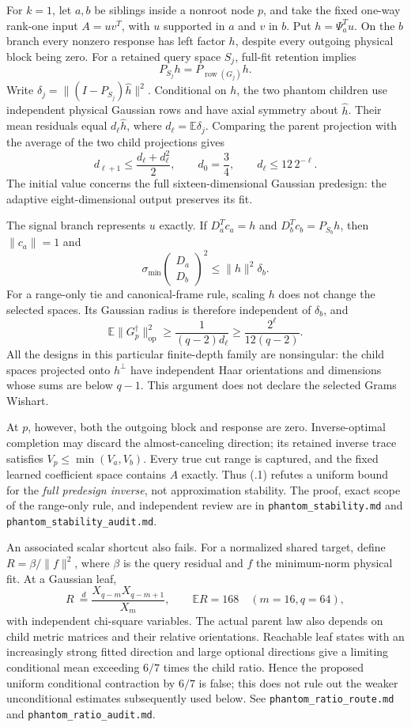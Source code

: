 \documentclass[11pt,oneside,openany,a4paper]{report}
\numberwithin{equation}{chapter}
\theoremstyle{definition}
\theoremstyle{remark}
\newcommand{\sourcefile}[1]{{\small\nolinkurl{#1}}}
\begin{document}
For $k=1$, let $a,b$ be siblings inside a nonroot node $p$, and take the
fixed one-way rank-one input $A=uv^T$, with $u$ supported in $a$ and $v$
in $b$.  Put $h=\Psi_a^Tu$.  On the $b$ branch every nonzero response
has left factor $h$, despite every outgoing physical block being zero.
For a retained query space $S_j$, full-fit retention implies
\[
 P_{S_j}h=P_{\operatorname{row}(G_j)}h.
\]
Write $\delta_j=\|(I-P_{S_j})\widehat h\|^2$.  Conditional on $h$,
the two phantom children use independent physical Gaussian rows and
have axial symmetry about $\widehat h$.  Their mean residuals equal
$d_\ell\widehat h$, where $d_\ell=\mathbb E\delta_j$.  Comparing the
parent projection with the average of the two child projections gives
\[
 d_{\ell+1}\le\frac{d_\ell+d_\ell^2}{2},\qquad
 d_0=\frac34,\qquad d_\ell\le12\,2^{-\ell}.
\]
The initial value concerns the full sixteen-dimensional Gaussian
predesign: the adaptive eight-dimensional output preserves its fit.

The signal branch represents $u$ exactly.  If $D_a^Tc_a=h$ and
$D_b^Tc_b=P_{S_b}h$, then $\|c_a\|=1$ and
\[
 \sigma_{\min}\!\begin{pmatrix}D_a\\D_b\end{pmatrix}^{\!2}
 \le\|h\|^2\delta_b.
\]
For a range-only tie and canonical-frame rule, scaling $h$ does not
change the selected spaces.  Its Gaussian radius is therefore
independent of $\delta_b$, and
\[
 \mathbb E\|G_p^\dagger\|_{\mathrm{op}}^2
 \ge\frac{1}{(q-2)d_\ell}
 \ge\frac{2^\ell}{12(q-2)}.
 \tag{\thechapter.1}
\]
All the designs in this particular finite-depth family are nonsingular:
the child spaces projected onto $h^\perp$ have independent Haar
orientations and dimensions whose sums are below $q-1$.  This argument
does not declare the selected Grams Wishart.

At $p$, however, both the outgoing block and response are zero.
Inverse-optimal completion may discard the almost-canceling direction;
its retained inverse trace satisfies $V_p\le\min(V_a,V_b)$.  Every
true cut range is captured, and the fixed learned coefficient space
contains $A$ exactly.  Thus (\thechapter.1) refutes a uniform bound for
the \emph{full predesign inverse}, not approximation stability.
The proof, exact scope of the range-only rule, and independent review
are in \sourcefile{phantom_stability.md} and
\sourcefile{phantom_stability_audit.md}.

An associated scalar shortcut also fails.  For a normalized shared
target, define $R=\beta/\|f\|^2$, where $\beta$ is the query residual
and $f$ the minimum-norm physical fit.  At a Gaussian leaf,
\[
 R\ \stackrel{d}{=}
 \frac{X_{q-m}X_{q-m+1}}{X_m},\qquad \mathbb ER=168
 \quad(m=16,q=64),
\]
with independent chi-square variables.  The actual parent law also
depends on child metric matrices and their relative orientations.
Reachable leaf states with an increasingly strong fitted direction and
large optional directions give a limiting conditional mean exceeding
$6/7$ times the child ratio.  Hence the proposed uniform conditional
contraction by $6/7$ is false; this does not rule out the weaker
unconditional estimates subsequently used below.
See \sourcefile{phantom_ratio_route.md} and
\sourcefile{phantom_ratio_audit.md}.
\end{document}
